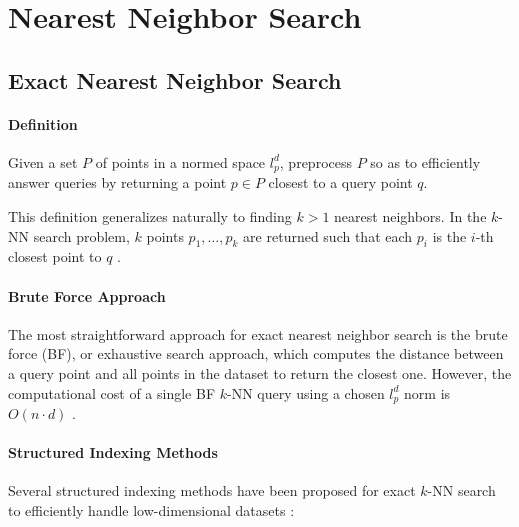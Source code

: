 \section{Nearest Neighbor Search}

\subsection{Exact Nearest Neighbor Search}

\paragraph{Definition}

Given a set $P$ of points in a normed space $l_p^d$, preprocess $P$ so as to efficiently answer queries by returning a point $p \in P$ closest to a query point $q$.

This definition generalizes naturally to finding $k > 1$ nearest neighbors. In the $k$-NN search problem, $k$ points $p_1, \dots, p_k$ are returned such that each $p_i$ is the $i$-th closest point to $q$ \cite{Gionis-Indyk-Motwani-1999}.

\paragraph{Brute Force Approach}

The most straightforward approach for exact nearest neighbor search is the brute force (BF), or exhaustive search approach, which computes the distance between a query point and all points in the dataset to return the closest one. However, the computational cost of a single BF $k$-NN query using a chosen $l_p^d$ norm is $O(n \cdot d)$ \cite{Ukey-Yang-Li-Zhang-Hu-Zhang-2023}.

\paragraph{Structured Indexing Methods}

Several structured indexing methods have been proposed for exact $k$-NN search to efficiently handle low-dimensional datasets \cite{Ukey-Yang-Li-Zhang-Hu-Zhang-2023}:

